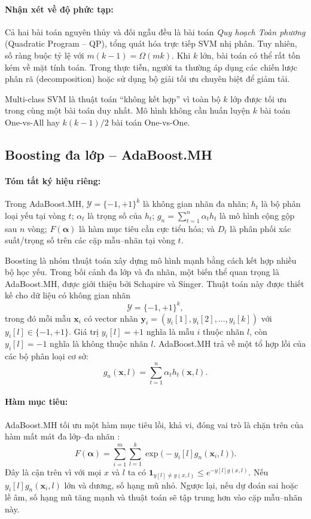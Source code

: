 \paragraph{Nhận xét về độ phức tạp:}
Cả hai bài toán nguyên thủy và đối ngẫu đều là bài toán \textit{Quy hoạch Toàn phương} (Quadratic Program -- QP), tổng quát hóa trực tiếp SVM nhị phân. Tuy nhiên, số ràng buộc tỷ lệ với $m(k-1)=\Omega(mk)$. Khi $k$ lớn, bài toán có thể rất tốn kém về mặt tính toán. Trong thực tiễn, người ta thường áp dụng các chiến lược phân rã (decomposition) hoặc sử dụng bộ giải tối ưu chuyên biệt để giảm tải.

\begin{notebox}
Multi-class SVM là thuật toán ``không kết hợp'' vì toàn bộ $k$ lớp được tối ưu trong cùng một bài toán duy nhất. Mô hình không cần huấn luyện $k$ bài toán One-vs-All hay $k(k-1)/2$ bài toán One-vs-One.
\end{notebox}

\subsection{Boosting đa lớp -- AdaBoost.MH}
\label{sssec:multiclass_boosting}

\paragraph{Tóm tắt ký hiệu riêng:}
Trong AdaBoost.MH, $\mathcal{Y}=\{-1,+1\}^k$ là không gian nhãn đa nhãn; $h_t$ là bộ phân loại yếu tại vòng $t$; $\alpha_t$ là trọng số của $h_t$; $g_n=\sum_{t=1}^{n}\alpha_t h_t$ là mô hình cộng gộp sau $n$ vòng; $F(\bm{\alpha})$ là hàm mục tiêu cần cực tiểu hóa; và $D_t$ là phân phối xác suất/trọng số trên các cặp mẫu--nhãn tại vòng $t$.

Boosting là nhóm thuật toán xây dựng mô hình mạnh bằng cách kết hợp nhiều bộ học yếu. Trong bối cảnh đa lớp và đa nhãn, một biến thể quan trọng là AdaBoost.MH, được giới thiệu bởi Schapire và Singer. Thuật toán này được thiết kế cho dữ liệu có không gian nhãn
\[
  \mathcal{Y}=\{-1,+1\}^{k},
\]
trong đó mỗi mẫu $\bm{x}_i$ có vector nhãn $\bm{y}_i=(y_i[1],y_i[2],\ldots,y_i[k])$ với $y_i[l]\in\{-1,+1\}$. Giá trị $y_i[l]=+1$ nghĩa là mẫu $i$ thuộc nhãn $l$, còn $y_i[l]=-1$ nghĩa là không thuộc nhãn $l$.
AdaBoost.MH trả về một tổ hợp lồi của các bộ phân loại cơ sở:
\[
  g_n(\bm{x},l)=\sum_{t=1}^{n}\alpha_t h_t(\bm{x},l).
\]

\paragraph{Hàm mục tiêu:}
AdaBoost.MH tối ưu một hàm mục tiêu lồi, khả vi, đóng vai trò là chặn trên của hàm mất mát đa lớp--đa nhãn \cite{mohri2018foundations}:
\begin{equation}
    F(\bm{\alpha})=
    \sum_{i=1}^{m}\sum_{l=1}^{k}
    \exp\bigl(-y_i[l]g_n(\bm{x}_i,l)\bigr).
    \label{eq:adaboost_mh_obj}
\end{equation}
Đây là cận trên vì với mọi $x$ và $l$ ta có $\mathbf{1}_{y[l]\neq g(x,l)} \leq e^{-y[l]g(x,l)}$. Nếu $y_i[l]g_n(\bm{x}_i,l)$ lớn và dương, số hạng mũ nhỏ. Ngược lại, nếu dự đoán sai hoặc lề âm, số hạng mũ tăng mạnh và thuật toán sẽ tập trung hơn vào cặp mẫu--nhãn này.


